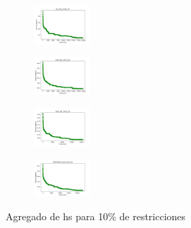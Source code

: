 \begin{figure}[H]
\begin{subfigure}
        \centering
        \includegraphics[width=0.234\textwidth]{img/hs/iris_set_const_10_3773969821_cost.png}
    \end{subfigure}
    \hfill
    \begin{subfigure}
        \centering
        \includegraphics[width=0.234\textwidth]{img/hs/ecoli_set_const_10_3773969821_cost.png}
    \end{subfigure}
    \hfill
    \begin{subfigure}
        \centering
        \includegraphics[width=0.234\textwidth]{img/hs/rand_set_const_10_3773969821_cost.png}
    \end{subfigure}
    \hfill
    \begin{subfigure}
        \centering
        \includegraphics[width=0.234\textwidth]{img/hs/newthyroid_set_const_10_3773969821_cost.png}
    \end{subfigure}
    \caption{Agregado de hs para 10\% de restricciones}
\end{figure}


\vspace*{\fill}
\newpage
\vspace*{\fill}

